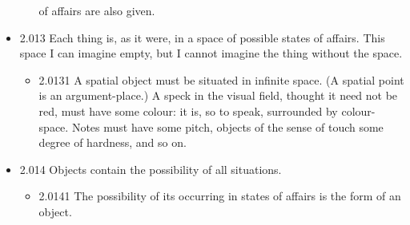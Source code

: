 \documentclass[11pt]{article}
\begin{document}
\begin{itemize}
\begin{itemize}
of affairs are also given.
\end{itemize}
\item 2.013
\label{sec:org1d95795}
Each thing is, as it were, in a space of possible states of affairs.
This space I can imagine empty, but I cannot imagine the thing without the
space.
\begin{itemize}
\item 2.0131
\label{sec:org191b741}
A spatial object must be situated in infinite space. (A spatial
point is an argument-place.) A speck in the visual field, thought it need
not be red, must have some colour: it is, so to speak, surrounded by colour-
space. Notes must have some pitch, objects of the sense of touch some
degree of hardness, and so on.
\end{itemize}
\item 2.014
\label{sec:orgda61591}
Objects contain the possibility of all situations.
\begin{itemize}
\item 2.0141
\label{sec:org8e1352a}
The possibility of its occurring in states of affairs is the form of
an object.
\end{itemize}
\end{itemize}
\end{document}
